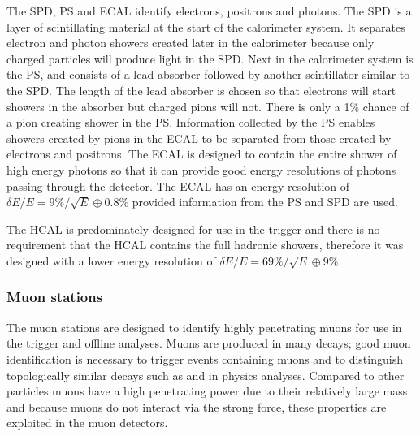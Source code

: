 The SPD, PS and ECAL identify electrons, positrons and photons. The SPD is a layer of scintillating material at the start of the calorimeter system. It separates electron and photon showers created later in the calorimeter because only charged particles will produce light in the SPD. Next in the calorimeter system is the PS, and consists of a lead absorber followed by another scintillator similar to the SPD. The length of the lead absorber is chosen so that electrons will start showers in the absorber but charged pions will not. There is only a 1$\%$ chance of a pion creating shower in the PS. Information collected by the PS enables showers created by pions in the ECAL to be separated from those created by electrons and positrons. The ECAL is designed to contain the entire shower of high energy photons so that it can provide good energy resolutions of photons passing through the detector. The ECAL has an energy resolution of $\delta E / E = 9\%/\sqrt{E} \oplus 0.8\%$  provided information from the PS and SPD are used. 

The HCAL is predominately designed for use in the trigger and there is no requirement that the HCAL contains the full hadronic showers, therefore it was designed with a lower energy resolution of $\delta E / E = 69\% / \sqrt{E} \oplus 9\%$. 


\subsubsection{Muon stations}
\label{Muon_stations}

The muon stations are designed to identify highly penetrating muons for use in the trigger and offline analyses. Muons are produced in many \bhadron decays; good muon identification is necessary to trigger events containing muons and to distinguish topologically similar decays such as \bmumu and \bdkpi in physics analyses. 
Compared to other particles muons have a high penetrating power due to their relatively large mass and because muons do not interact via the strong force, these properties are exploited in the muon detectors. 

